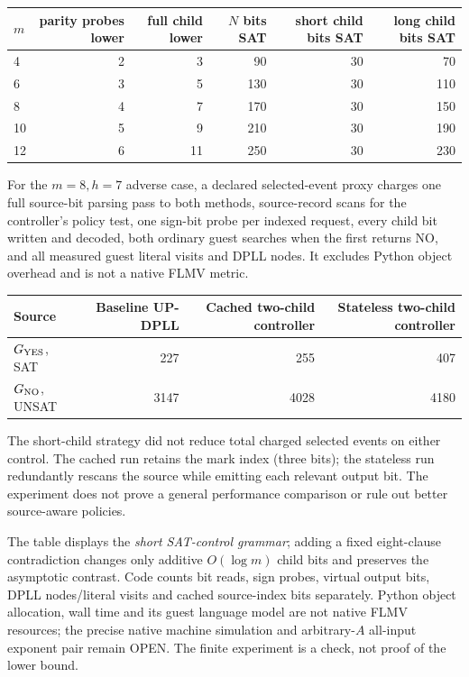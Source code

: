 \documentclass[10pt]{article}
\begin{document}
\begin{center}\small
\begin{tabular}{lrrrrr}\toprule
$m$ & parity probes lower & full child lower & $N$ bits SAT & short child bits SAT & long child bits SAT\\\midrule
4 &2&3&90&30&70\\
6 &3&5&130&30&110\\
8 &4&7&170&30&150\\
10&5&9&210&30&190\\
12&6&11&250&30&230\\\bottomrule
\end{tabular}
\end{center}
For the $m=8,h=7$ adverse case, a declared selected-event proxy charges one full source-bit parsing pass to both methods, source-record scans for the controller's policy test, one sign-bit probe per indexed request, every child bit written and decoded, both ordinary guest searches when the first returns NO, and all measured guest literal visits and DPLL nodes. It excludes Python object overhead and is not a native FLMV metric.
\begin{center}\small
\begin{tabular}{lrrr}\toprule
Source & Baseline UP-DPLL & Cached two-child controller & Stateless two-child controller\\\midrule
$G_{\rm YES}$, SAT &227&255&407\\
$G_{\rm NO}$, UNSAT &3147&4028&4180\\\bottomrule
\end{tabular}
\end{center}
The short-child strategy did not reduce total charged selected events on either control. The cached run retains the mark index (three bits); the stateless run redundantly rescans the source while emitting each relevant output bit. The experiment does not prove a general performance comparison or rule out better source-aware policies.

The table displays the \emph{short SAT-control grammar}; adding a fixed eight-clause contradiction changes only additive $O(\log m)$ child bits and preserves the asymptotic contrast. Code counts bit reads, sign probes, virtual output bits, DPLL nodes/literal visits and cached source-index bits separately. Python object allocation, wall time and its guest language model are not native FLMV resources; the precise native machine simulation and arbitrary-$A$ all-input exponent pair remain OPEN. The finite experiment is a check, not proof of the lower bound.
\end{document}
